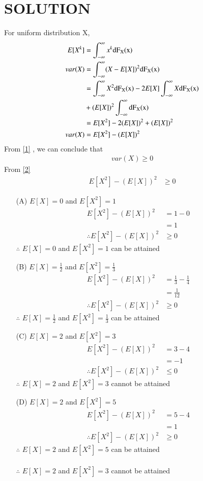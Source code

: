 \documentclass[journal,12pt,twocolumn]{IEEEtran}
\begin{document}
\section*{SOLUTION}
For uniform distribution X,
\begin{align}
E[X^k]&= \int_{-\infty}^{\infty} x^k \mathrm{dF_X(x)} \label{eq:1} \\
var(X)&= \int_{-\infty}^{\infty} (X-E[X])^2\mathrm{dF_X(x)} \\
&=\int_{-\infty}^{\infty}X^2\mathrm{dF_X(x)}  - 2E[X]\int_{-\infty}^{\infty}X \mathrm{dF_X(x)}   \notag \\
& +(E[X])^2\int_{-\infty}^{\infty} \mathrm{dF_X(x)} \\
&=E[X^2]-2(E[X])^2+(E[X])^2 \\
var(X)&=E[X^2]-(E[X])^2 \label{1}
\end{align}
From \eqref{1} , we can conclude that 
\begin{align}
var(X) \geq 0 \label{2}
\end{align}
From \eqref{2}
\begin{align}
E[X^2]-(E[X])^2 & \geq 0
\end{align}
\begin{enumerate}
\item[(A)] $E[X]=0$ and $E[X^2]=1$
\begin{align}
E[X^2]-(E[X])^2 &=1 - 0\\
&=1\\
\therefore E[X^2]-(E[X])^2 &\geq 0
\end{align}
$\therefore$ $E[X]=0$ and $E[X^2]=1$ can be attained \\
\item[(B)] $E[X]=\frac{1}{2}$ and $E[X^2]=\frac{1}{3}$
\begin{align}
E[X^2]-(E[X])^2 &=\frac{1}{3} - \frac{1}{4}\\
&=\frac{1}{12}\\
\therefore E[X^2]-(E[X])^2 &\geq 0
\end{align}
$\therefore$ $E[X]=\frac{1}{2}$ and $E[X^2]=\frac{1}{3}$ can be attained \\
\item[(C)] $E[X]=2$ and $E[X^2]=3$
\begin{align}
E[X^2]-(E[X])^2 &=3 - 4\\
&=-1\\
\therefore E[X^2]-(E[X])^2 &\leq 0
\end{align}
$\therefore$ $E[X]=2$ and $E[X^2]=3$ cannot be attained \\
\item[(D)] $E[X]=2$ and $E[X^2]=5$
\begin{align}
E[X^2]-(E[X])^2 &=5 - 4\\
&=1\\
\therefore E[X^2]-(E[X])^2 &\geq 0
\end{align}
$\therefore$ $E[X]=2$ and $E[X^2]=5$ can be attained\\ \\
$\therefore$ $E[X]=2$ and $E[X^2]=3$ cannot be attained\\
\end{enumerate}
\end{document}

